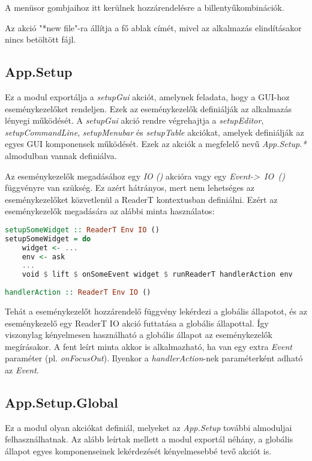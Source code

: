 A menüsor gombjaihoz itt kerülnek hozzárendelésre a billentyűkombinációk.

Az akció "*new file"-ra állítja a fő ablak címét, mivel az alkalmazás elindításakor nincs betöltött fájl.

\subsection{App.Setup}

Ez a modul exportálja a \textit{setupGui} akciót, amelynek feladata, hogy a GUI-hoz eseménykezelőket rendeljen. Ezek az eseménykezelők definiálják az alkalmazás lényegi működését. A \textit{setupGui} akció rendre végrehajtja a \textit{setupEditor}, \textit{setupCommandLine}, \textit{setupMenubar} és \textit{setupTable} akciókat, amelyek definiálják az egyes GUI komponensek működését. Ezek az akciók a megfelelő nevű \textit{App.Setup.*} almodulban vannak definiálva.

Az eseménykezelők megadásához egy \textit{IO ()} akcióra vagy egy \mbox{\textit{Event-> IO ()}} függvényre van szükség. Ez azért hátrányos, mert nem lehetséges az eseménykezelőket közvetlenül a ReaderT kontextusban definiálni. Ezért az eseménykezelők megadására az alábbi minta használatos:

\begin{lstlisting}[language={Haskell}]
setupSomeWidget :: ReaderT Env IO ()
setupSomeWidget = do
	widget <- ...
	env <- ask
	...
	void $ lift $ onSomeEvent widget $ runReaderT handlerAction env
	
handlerAction :: ReaderT Env IO ()
\end{lstlisting}

Tehát a eseménykezelőt hozzárendelő függvény lekérdezi a globális állapotot, és az eseménykezelő egy ReaderT IO akció futtatása a globális állapottal. Így viszonylag kényelmesen használható a globális állapot az eseménykezelők megírásakor. A fent leírt minta akkor is alkalmazható, ha van egy extra \textit{Event} paraméter (pl. \textit{onFocusOut}).  Ilyenkor a \textit{handlerAction}-nek paraméterként adható az \textit{Event}.

\subsection{App.Setup.Global}

Ez a modul olyan akciókat definiál, melyeket az \textit{App.Setup} további almoduljai felhasználhatnak. Az alább leírtak mellett a modul exportál néhány, a globális állapot egyes komponenseinek lekérdezését kényelmesebbé tevő akciót is.

